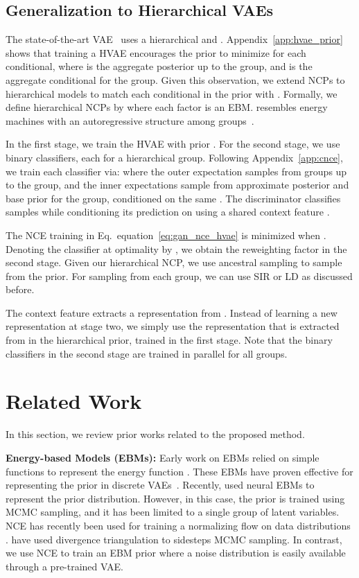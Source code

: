 \documentclass{article} \usepackage{iclr2021_conference,times}
\def\eqref#1{equation~\ref{#1}}
\begin{document}
\subsection{Generalization to Hierarchical VAEs}
The state-of-the-art VAE~\citep{vahdat2020NVAE} uses a hierarchical  and . Appendix~\ref{app:hvae_prior} shows that training a HVAE encourages the prior to minimize  for each conditional, where  is the aggregate posterior up to the  group, and  is the aggregate conditional for the  group. 
Given this observation, we extend NCPs to hierarchical models to match each conditional in the prior with . Formally, we define hierarchical NCPs by  where each factor is an EBM.  resembles energy machines with an autoregressive structure among  groups~\citep{nash2019autoregressive}.  

In the first stage, we train the HVAE with prior . For the second stage, we use  binary classifiers, each for a hierarchical group. 
Following Appendix~\ref{app:cnce}, we train each classifier via:
where the outer expectation samples from groups up to the  group, and the inner expectations sample from approximate posterior and base prior for the  group, conditioned on the same . The discriminator  classifies samples  while conditioning its prediction on  using a shared context feature . 

The NCE training in Eq.~\eqref{eq:gan_nce_hvae} is minimized when . Denoting the classifier at optimality by , we obtain the reweighting factor   in the second stage. Given our hierarchical NCP, we use ancestral sampling to sample from the prior. For sampling from each group, we can use SIR or LD as discussed before. 

The context feature  extracts a representation from . Instead of learning a new representation at stage two, we simply use the representation that is extracted from  in the hierarchical prior, trained in the first stage. Note that the binary classifiers in the second stage are trained in parallel for all groups. 
 \vspace{-0.1cm}
\section{Related Work}
In this section, we review prior works related to the proposed method.

\textbf{Energy-based Models (EBMs):} Early work on EBMs relied on simple functions to represent the energy function \citep{hinton2002training, hinton2006fast}. These EBMs have proven effective for representing the prior in discrete VAEs~\citep{rolfe2016discrete, vahdat2018dvaes, Vahdat2018DVAE++, vahdat2019UndirectedPost}.  
Recently, \citet{pang2020EBMPrior}  used neural EBMs to represent the prior distribution. However, in this case, the prior is trained using MCMC sampling, and it has been limited to a single group of latent variables. 
NCE \citep{gutmann2010nce} has recently been  used for training a normalizing flow on data distributions \citep{gao2020flowNCE}. \citet{han2019divergence, han2020joint} have used divergence triangulation to sidesteps MCMC sampling. In contrast, we use NCE to train an EBM prior where a noise distribution is easily available through a pre-trained VAE. 
\end{document}
